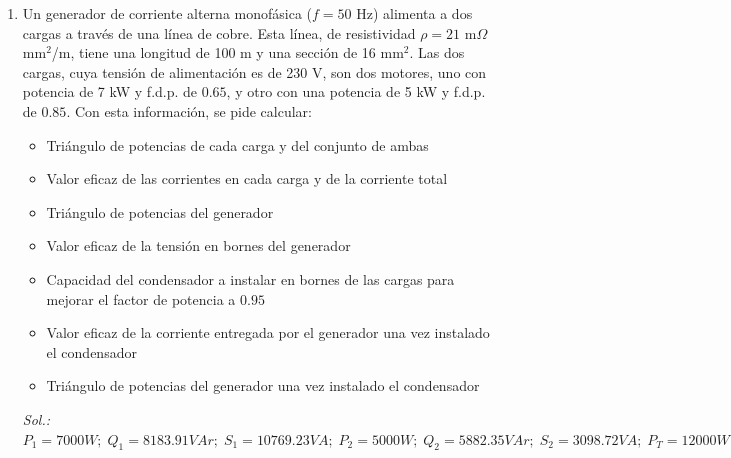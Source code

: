 \documentclass[11pt]{book} %
\begin{document}
\begin{enumerate}
\begin{itemize}
    \item La potencia aparente del generador
    \item La capacidad del condensador necesario para compensar el factor de potencia a la unidad
    \item El valor eficaz de la corriente absorbida por el conjunto condensador-motor
    \item La potencia aparente del generador necesario una vez conectado el condensador del tercer apartado
    \item Compara de forma razonada los resultados de los apartados 4 y 5 con los valores calculados en los apartados 1 y 2
\end{itemize}
\emph{Sol.: $I= {43.5}{A};\; S_g = {10}{kVA};\;C={361}{\mu F};\, I'=34.78A;\, S_g' = {8000}{kVA}$}

\item Un generador de corriente alterna monofásica ($f=50$ Hz) alimenta a dos cargas a través de una línea de cobre. Esta línea, de resistividad $\rho=21$ m$\Omega$ mm$^2$/m, tiene una longitud de 100 m y una sección de 16 mm$^2$. Las dos cargas, cuya tensión de alimentación es de 230 V, son dos motores, uno con potencia de 7 kW y f.d.p. de $0.65$, y otro con una potencia de 5 kW y f.d.p. de $0.85$. Con esta información, se pide calcular:
\begin{itemize}
    \item Triángulo de potencias de cada carga y del conjunto de ambas
    \item Valor eficaz de las corrientes en cada carga y de la corriente total
    \item Triángulo de potencias del generador
    \item Valor eficaz de la tensión en bornes del generador
    \item Capacidad del condensador a instalar en bornes de las cargas para mejorar el factor de potencia a $0.95$
    \item Valor eficaz de la corriente entregada por el generador una vez instalado el condensador
    \item Triángulo de potencias del generador una vez instalado el condensador
\end{itemize}
\emph{Sol.: $P_1=7000W;\; Q_1=8183.91VAr;\;S_1=10769.23VA;\;P_2=5000W;\;Q_2=5882.35VAr;\;S_2=3098.72VA;\;P_T=12000W;\;Q_T=11282.63VAr;\;S_T=16471.12VA;\, I_1=46.82\,A;\;I_2=25.58\,A;\;I_T=71.62\,A;\,P_g=13333.65 W;\;Q_g=11282.63 VAr;\,S_g=17466.65 VA;\;U_g=243.88 V;\; C=441.66 \mu F;\,I'=54.92 A;\;P_g'=12784.21 W;\;Q_g'=3944.21 VAr;\;S_g'=13378.82 VA$}

\end{enumerate}
\end{document}
